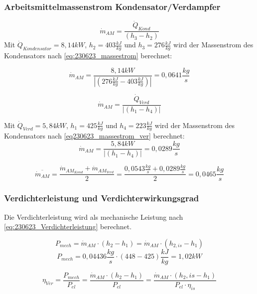 \subsubsection{Arbeitsmittelmassenstrom Kondensator/Verdampfer}
\begin{equation}
   \dot m_{AM} = \frac{\dot Q_{Kond}}{(h_3 - h_2)}
   \label{eq:230623_massestrom}
\end{equation}
Mit $\dot Q_{Kondensator}=8,14kW$, $h_2=403\frac{kJ}{kg}$ und $h_3=276\frac{kJ}{kg}$ wird der Massenstrom des Kondensators nach \autoref*{eq:230623_massestrom} berechnet:

$$ \dot m_{AM} = \frac{8,14kW}{|(276\frac{kJ}{kg} - 403\frac{kJ}{kg})|} = 0,0641 \frac{kg}{s} $$

\begin{equation}
  \dot m_{AM} = \frac{\dot Q_{Verd}}{|(h_1-h_4)|}
    \label{eq230623_massestrom_ver}
\end{equation}

Mit $\dot Q_{Verd}=5,84kW$, $h_1=425\frac{kJ}{kg}$ und $h_4=223\frac{kJ}{kg}$ wird der Massenstrom des Kondensators nach \autoref*{eq230623_massestrom_ver} berechnet:
$$\dot m_{AM} = \frac{5,84 kW}{|(h_1-h_4)|} = 0,0289 \frac{kg}{s}$$

$$\overline{\dot m_{AM}} = \frac{\dot m_{AM_{Kond}}+\dot m_{AM_{Verd}}}{2} = \frac{0,0543 \frac{kg}{s}+0,0289 \frac{kg}{s}}{2} = 0,0465 \frac{kg}{s} $$



\subsubsection{Verdichterleistung und Verdichterwirkungsgrad}

Die Verdichterleistung wird als mechanische Leistung nach \autoref{eq:230623_Verdichterleistung} berechnet.

\begin{equation}
    P_{mech} = \dot m_{AM} \cdot (h_2-h_1) = \dot m_{AM}\cdot (h_{2,is}-h_1)
\label{eq:230623_Verdichterleistung}
\end{equation}
$$  P_{mech} = 0,04436 \frac{kg}{s} \cdot (448-425)\frac{kJ}{kg} = 1,02 kW $$

\begin{equation}
  \eta_{Ver} = \frac{P_{mech}}{P_{el}}=\frac{\dot m_{AM}\cdot (h_2-h_1)}{P_{el}}=\frac{\dot m_{AM}\cdot (h_2,is-h_1)}{P_{el}\cdot \eta_{is}}
\label{eq:230623_Verdichterwirkungsgrad}
\end{equation}

